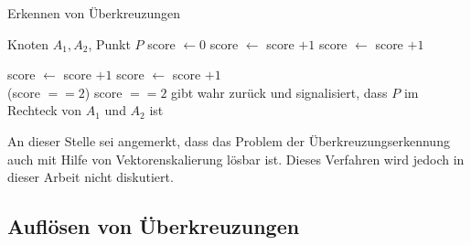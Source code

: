 \begin{algorithm}[H] %
    \caption{Erkennen von Überkreuzungen}
    \label{alg:check-point-in-rect}
    \begin{algorithmic}[1]
        \Require Knoten $A_1,A_2$, Punkt $P$
        \State score $\gets 0$
                \State score $\gets$ score $+ 1$
            \EndIf
        \Else
                \State score $\gets$ score $+ 1$
            \EndIf
        \EndIf

                \State score $\gets$ score $+ 1$
            \EndIf
        \Else
                \State score $\gets$ score $+ 1$
            \EndIf
        \EndIf\\
        \Return (score $== 2$)
        \Comment score $==2$ gibt wahr zurück und signalisiert, dass $P$ im Rechteck von $A_1$ und $A_2$ ist
    \end{algorithmic}
\end{algorithm}
An dieser Stelle sei angemerkt, dass das Problem der Überkreuzungserkennung auch mit Hilfe von Vektorenskalierung lösbar ist.
Dieses Verfahren wird jedoch in dieser Arbeit nicht diskutiert.


\subsection{Auflösen von Überkreuzungen}


